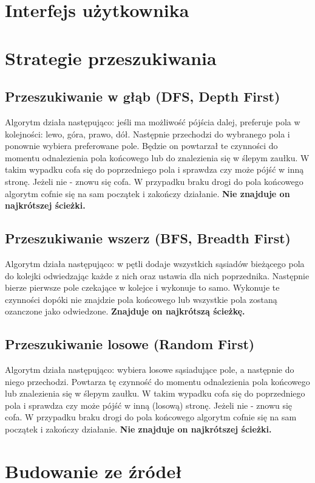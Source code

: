 \documentclass[12pt,a4paper]{article}
\begin{document}
	\section{Interfejs użytkownika}
	
	\section{Strategie przeszukiwania}
	\subsection{Przeszukiwanie w głąb (DFS, Depth First)}
	Algorytm działa następująco: jeśli ma możliwość pójścia dalej,
	preferuje pola w kolejności: lewo, góra, prawo, dół. Następnie 
	przechodzi do wybranego pola i ponownie wybiera preferowane pole. 
	Będzie on powtarzał te czynności do momentu odnalezienia 
	pola końcowego lub do znalezienia się w ślepym zaułku. W takim	
	wypadku cofa się do poprzedniego pola i sprawdza czy może pójść w 
	inną stronę. Jeżeli nie - znowu się cofa. W przypadku braku
	drogi do pola końcowego algorytm cofnie się na sam początek i
	zakończy działanie. \textbf{Nie znajduje on najkrótszej ścieżki.}
	
	\subsection{Przeszukiwanie wszerz (BFS, Breadth First)}
	Algorytm działa następująco: w pętli dodaje wszystkich sąsiadów 
	bieżącego pola do kolejki odwiedzając każde z nich oraz ustawia 
	dla nich poprzednika. Następnie bierze pierwsze pole czekające w 
	kolejce i wykonuje to samo. Wykonuje te czynności dopóki nie 
	znajdzie pola końcowego lub wszystkie pola zostaną ozanczone jako 
	odwiedzone.
	\textbf{Znajduje on najkrótszą ścieżkę.}
	
	\subsection{Przeszukiwanie losowe (Random First)}
	Algorytm działa następująco: wybiera losowe sąsiadujące pole, a
	następnie do niego przechodzi. Powtarza tę czynność do momentu
	odnalezienia pola końcowego lub znalezienia się w ślepym zaułku. W 
	takim wypadku cofa się do poprzedniego pola i sprawdza czy może
	pójść w inną (losową) stronę. Jeżeli nie - znowu się cofa. W 
	przypadku braku drogi do pola końcowego algorytm cofnie się na sam 
	początek i zakończy działanie. \textbf{Nie znajduje on najkrótszej 
	ścieżki.}
	
	\section{Budowanie ze źródeł}
\end{document}
